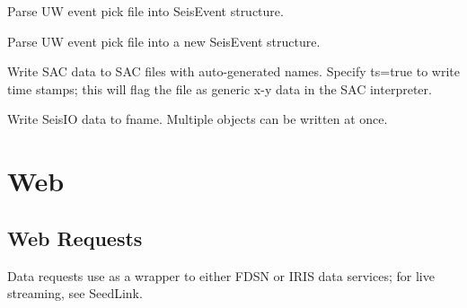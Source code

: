 \documentclass[letterpaper,11pt,english]{sphinxmanual}
\begin{document}
Parse UW event pick file into SeisEvent structure.

\begin{fulllineitems}
\label{\detokenize{src/Formats/fileformats:uwpf}}
\end{fulllineitems}


Parse UW event pick file  into a new SeisEvent structure.

\begin{fulllineitems}
\label{\detokenize{src/Formats/fileformats:writesac}}
\end{fulllineitems}


Write SAC data to SAC files with auto-generated names. Specify ts=true to write time stamps; this will flag the file as generic x-y data in the SAC interpreter.

\begin{fulllineitems}
\label{\detokenize{src/Formats/fileformats:wseis}}
\end{fulllineitems}


\begin{fulllineitems}
\end{fulllineitems}


Write SeisIO data to fname. Multiple objects can be written at once.


\chapter{Web}
\label{\detokenize{index:web}}

\section{Web Requests}
\label{\detokenize{src/Web/webclients:web-requests}}\label{\detokenize{src/Web/webclients::doc}}
Data requests use  as a wrapper to either FDSN or IRIS data services; for live streaming, see SeedLink.
\end{document}
